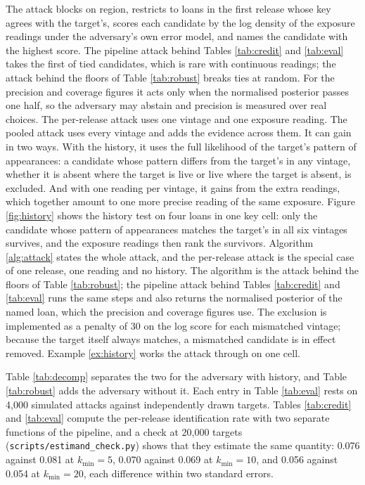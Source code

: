 \documentclass[11pt,a4paper]{article}
\theoremstyle{plain}
\theoremstyle{definition}
\theoremstyle{definition}
\theoremstyle{plain}
\begin{document}
The attack blocks on region, restricts to loans in the first release whose key
agrees with the target's, scores each candidate by the log density of the
exposure readings under the adversary's own error model, and names the candidate
with the highest score. The pipeline attack behind Tables \ref{tab:credit} and
\ref{tab:eval} takes the first of tied candidates, which is rare with continuous
readings; the attack behind the floors of Table \ref{tab:robust} breaks ties at
random. For the precision and coverage
figures it acts only when the normalised posterior passes one half, so the
adversary may abstain and precision is measured over real choices. The
per-release attack uses one vintage and one exposure reading. The pooled attack
uses every vintage and adds the evidence across them. It can gain in two ways.
With the history, it uses the full likelihood of the target's pattern of
appearances: a candidate whose pattern differs from the target's in any vintage,
whether it is absent where the target is live or live where the target is
absent, is excluded. And with one reading per vintage, it gains from the extra
readings, which together amount to one more precise reading of the same exposure.
Figure \ref{fig:history} shows the history test on four loans in one key cell:
only the candidate whose pattern of appearances matches the target's in all six
vintages survives, and the exposure readings then rank the survivors.
Algorithm \ref{alg:attack} states the whole attack, and the per-release attack is
the special case of one release, one reading and no history. The algorithm is
the attack behind the floors of Table \ref{tab:robust}; the pipeline attack
behind Tables \ref{tab:credit} and \ref{tab:eval} runs the same steps and also
returns the normalised posterior of the named loan, which the precision and
coverage figures use. The exclusion is
implemented as a penalty of 30 on the log score for each mismatched vintage;
because the target itself always matches, a mismatched candidate is in effect
removed. Example \ref{ex:history} works the attack through on one cell.




Table \ref{tab:decomp} separates the two for the adversary with history, and
Table \ref{tab:robust} adds the adversary without it. Each entry in Table
\ref{tab:eval} rests on 4{,}000 simulated attacks against independently drawn
targets. Tables \ref{tab:credit} and \ref{tab:eval} compute the per-release
identification rate with two separate functions of the pipeline, and a check at
20{,}000 targets (\texttt{scripts/estimand\_check.py}) shows that they estimate
the same quantity: 0.076 against 0.081 at $k_{\min} = 5$, 0.070 against 0.069 at
$k_{\min} = 10$, and 0.056 against 0.054 at $k_{\min} = 20$, each difference
within two standard errors.
\end{document}
